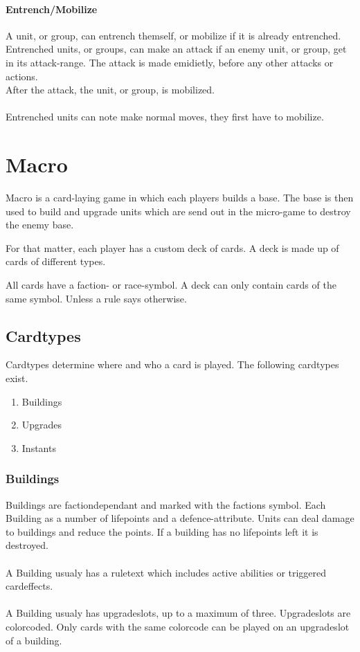 \documentclass[a5paper,pagesize,10pt,bibtotoc,pointlessnumbers,
normalheadings,DIV=9,twoside=false]{scrbook}
\begin{document}
\subsubsection{Entrench/Mobilize}
A unit, or group, can entrench themself, or mobilize if it is already entrenched.
Entrenched units, or groups, can make an attack if an enemy unit, or group, get in its attack-range.
The attack is made emidietly, before any other attacks or actions.\\
After the attack, the unit, or group, is mobilized.\\
\\
Entrenched units can note make normal moves, they first have to mobilize.

\chapter{Macro}
Macro is a card-laying game in which each players builds a base. The base is then used to build and upgrade units which are send out in the micro-game to destroy the enemy base.

For that matter, each player has a custom deck of cards. A deck is made up of cards of different types.

All cards have a faction- or race-symbol. A deck can only contain cards of the same symbol. Unless a rule says otherwise.

\section{Cardtypes}
Cardtypes determine where and who a card is played. The following cardtypes exist.

\begin{enumerate}
\item Buildings
\item Upgrades
\item Instants
\end{enumerate}

\subsection{Buildings}
Buildings are factiondependant and marked with the factions symbol. Each Building as a number of lifepoints and a defence-attribute.
Units can deal damage to buildings and reduce the points. If a building has no lifepoints left it is destroyed.\\
\\
A Building usualy has a ruletext which includes active abilities or triggered cardeffects.\\
\\
A Building usualy has upgradeslots, up to a maximum of three.
Upgradeslots are colorcoded. Only cards with the same colorcode can be played on an upgradeslot of a building.
\end{document}
